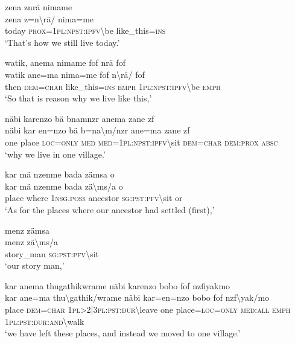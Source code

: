 \ea\label{ex:2:a1732}
zena znrä nimame\\
\gll zena	z=n{\textbackslash}rä/	nima=me\\
     today	\textsc{prox}=1\textsc{pl}:\textsc{npst}:\textsc{ipfv}{\textbackslash}be	like\_this=\textsc{ins}\\
\glt `That's how we still live today.'
\z

\ea\label{ex:2:a1733}
watik, anema nimame fof nrä fof\\
\gll watik	ane=ma	nima=me	fof	n{\textbackslash}rä/	fof\\
     then	\textsc{dem}=\textsc{char}	like\_this=\textsc{ins}	\textsc{emph}	1\textsc{pl}:\textsc{npst}:\textsc{ipfv}{\textbackslash}be	\textsc{emph}\\
\glt `So that is reason why we live like this,'
\z

\ea\label{ex:2:a1734}
näbi karenzo bä bnamnzr anema zane zf\\
\gll näbi	kar	en=nzo	bä	b=na{\textbackslash}m/nzr	ane=ma	zane	zf\\
     one	place	\textsc{loc}=\textsc{only}	\textsc{med}	\textsc{med}=1\textsc{pl}:\textsc{npst}:\textsc{ipfv}{\textbackslash}sit	\textsc{dem}=\textsc{char}	\textsc{dem}:\textsc{prox}	\textsc{absc}\\
\glt `why we live in one village.'
\z

\ea\label{ex:2:a1735}
kar mä nzenme bada zämsa o\\
\gll kar	mä	nzenme	bada	zä{\textbackslash}ms/a	o\\
     place	where	1\textsc{nsg}.\textsc{poss}	ancestor	\textsc{sg}:\textsc{pst}:\textsc{pfv}{\textbackslash}sit	or\\
\glt `As for the places where our ancestor had settled (first),'
\z

\ea\label{ex:2:a1736}
menz zämsa\\
\gll menz	zä{\textbackslash}ms/a\\
     story\_man	\textsc{sg}:\textsc{pst}:\textsc{pfv}{\textbackslash}sit\\
\glt `our story man,'
\z

\ea\label{ex:2:a1737}
kar anema thugathikwrame näbi karenzo bobo fof nzfiyakmo\\
\gll kar	ane=ma	thu{\textbackslash}gathik/wrame	näbi	kar=en=nzo	bobo	fof	nzf{\textbackslash}yak/mo\\
     place	\textsc{dem}=\textsc{char}	1\textsc{pl}>2|3\textsc{pl}:\textsc{pst}:\textsc{dur}{\textbackslash}leave	one	place=\textsc{loc}=\textsc{only}	\textsc{med}:\textsc{all}	\textsc{emph}	1\textsc{pl}:\textsc{pst}:\textsc{dur}:\textsc{and}{\textbackslash}walk\\
\glt `we have left these places, and instead we moved to one village.'
\z

